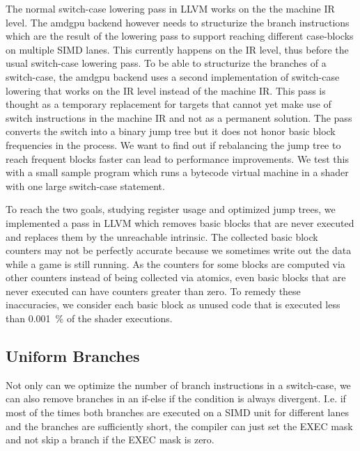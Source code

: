 The normal switch-case lowering pass in LLVM works on the the machine IR level.
The amdgpu backend however needs to structurize the branch instructions which are the result of the lowering pass to support reaching different case-blocks on multiple SIMD lanes.
This currently happens on the IR level, thus before the usual switch-case lowering pass.
To be able to structurize the branches of a switch-case, the amdgpu backend uses a second implementation of switch-case lowering that works on the IR level instead of the machine IR.
This pass is thought as a temporary replacement for targets that cannot yet make use of switch instructions in the machine IR and not as a permanent solution.
The pass converts the switch into a binary jump tree but it does not honor basic block frequencies in the process.
We want to find out if rebalancing the jump tree to reach frequent blocks faster can lead to performance improvements.
We test this with a small sample program which runs a bytecode virtual machine in a shader with one large switch-case statement.

To reach the two goals, studying register usage and optimized jump trees, we implemented a pass in LLVM which removes basic blocks that are never executed and replaces them by the unreachable intrinsic.
The collected basic block counters may not be perfectly accurate because we sometimes write out the data while a game is still running.
As the counters for some blocks are computed via other counters instead of being collected via atomics, even basic blocks that are never executed can have counters greater than zero.
To remedy these inaccuracies, we consider each basic block as unused code that is executed less than \SI{0.001}{\percent} of the shader executions.

\subsection{Uniform Branches}
\label{sub:uniformity_branch}
Not only can we optimize the number of branch instructions in a switch-case, we can also remove branches in an if-else if the condition is always divergent.
I.e. if most of the times both branches are executed on a SIMD unit for different lanes and the branches are sufficiently short, the compiler can just set the EXEC mask and not skip a branch if the EXEC mask is zero.

